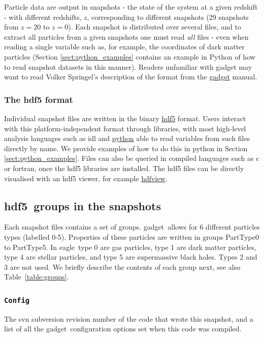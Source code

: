 \documentclass[10pt, a4paper]{article}
\newcommand{\eagle}{{\sc eagle}}
\newcommand{\hdf}{{\sc hdf5}}
\newcommand{\gadget}{{\sc gadget}}
\begin{document}
Particle data are output in snapshots - the state of the system at a given
redshift - with different redshifts, $z$, corresponding to different snapshots
(29 snapshots from $z=20$ to $z=0$). Each snapshot is distributed over several
files, and to extract all particles from a given snapshots one must read {\em
all} files - even when reading a single variable such as, for example, the
coordinates of dark matter particles (Section \ref{sect:python_examples}
contains an example in {\sc Python} of how to read snapshot datasets in this
manner). Readers unfamiliar with {\sc gadget} may want to read Volker Springel's
description of the format from the
{\color{blue}\href{https://wwwmpa.mpa-garching.mpg.de/gadget/users-guide.pdf}{\sc
gadget} manual}.

\subsubsection{The {\sc hdf5} format}
Individual snapshot files are written in the binary
{\color{blue}\href{https://www.hdfgroup.org/HDF5/}{\sc hdf5} format}. Users
interact with this platform-independent format through libraries, with most
high-level analysis languages such as {\sc idl} and
{\color{blue}\href{https://www.python.org/}{\sc python}} able to read variables
from such files directly by name. We provide examples of how to do this in {\sc
python} in Section \ref{sect:python_examples}.  Files can also be queried in
compiled languages such as {\sc c} or {\sc fortran}, once the {\sc hdf5}
libraries are installed. The {\sc hdf5} files can be directly visualised with
an {\sc hdf5} viewer, for example
{\color{blue}\href{https://www.hdfgroup.org/hdf-java-html/hdfview/}{hdfview}}.

\subsection{\hdf\ groups in the snapshots}
\label{sect:fof}
Each snapshot files contains a set of groups. \gadget\ allows for 6 different
particles types (labelled 0-5). Properties of these particles are written in
groups PartType0 to PartType5. In \eagle\ type 0 are gas particles, type 1 are
dark matter particles, type 4 are stellar particles, and type 5 are
supermassive black holes. Types 2 and 3 are not used. We briefly describe the
contents of each group next, see also Table~\ref{table:groups}.

\subsubsection{\texttt{Config}}
The svn subversion revision number of the code that wrote this snapshot, and a
list of all the \gadget\ configuration options set when this code was compiled.
\end{document}
